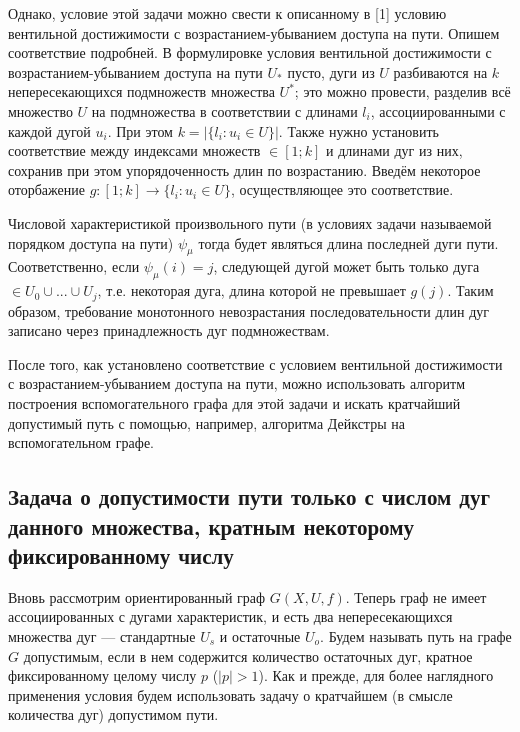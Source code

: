 Однако, условие этой задачи можно свести к описанному в [1] условию вентильной достижимости с возрастанием-убыванием доступа на пути. Опишем соответствие подробней. В формулировке условия вентильной достижимости с возрастанием-убыванием доступа на пути $U_*$ пусто, дуги из $U$ разбиваются на $k$ непересекающихся подмножеств множества $U^*$; это можно провести, разделив всё множество $U$ на подмножества в соответствии с длинами $l_i$, ассоциированными с каждой дугой $u_i$. При этом $k = |\{ l_i : u_i \in U\}|$. Также нужно установить соответствие между индексами множеств $\in [1; k]$ и длинами дуг из них, сохранив при этом упорядоченность длин по возрастанию. Введём некоторое оторбажение $g:[1; k]\to \{ l_i : u_i \in U\}$, осуществляющее это соответствие. 

Числовой характеристикой произвольного пути (в условиях задачи называемой порядком доступа на пути) $\psi_\mu$ тогда будет являться длина последней дуги пути. Соответственно, если $\psi_\mu(i) = j$, следующей дугой может быть только дуга $\in U_0 \cup ... \cup U_j$, т.е. некоторая дуга, длина которой не превышает $g(j)$. Таким образом, требование монотонного невозрастания последовательности длин дуг записано через принадлежность дуг подмножествам. 

После того, как установлено соответствие с условием вентильной достижимости с возрастанием-убыванием доступа на пути, можно использовать алгоритм построения вспомогательного графа для этой задачи и искать кратчайший допустимый путь с помощью, например, алгоритма Дейкстры на вспомогательном графе. 

\subsection{Задача о допустимости пути только с числом дуг данного множества, кратным некоторому фиксированному числу}

Вновь рассмотрим ориентированный граф $G(X,U,f)$. Теперь граф не имеет ассоциированных с дугами характеристик, и есть два непересекающихся множества дуг --- стандартные $U_s$ и остаточные $U_o$. Будем называть путь на графе $G$ допустимым, если в нем содержится количество остаточных дуг, кратное фиксированному целому числу $p$ ($|p| > 1$). Как и прежде, для более наглядного применения условия будем использовать задачу о  кратчайшем (в смысле количества дуг) допустимом пути.

